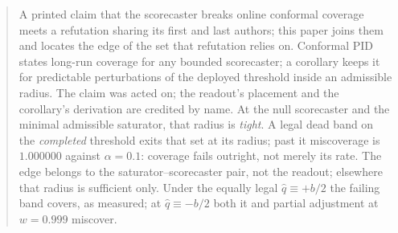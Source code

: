 \documentclass{article}
\begin{document}
\begin{abstract}
A printed claim that the scorecaster breaks online conformal coverage meets a
refutation sharing its first and last authors; this paper joins them and locates the edge of the set that
refutation relies on. Conformal PID states long-run coverage for any
bounded scorecaster; a corollary keeps it for predictable perturbations of the deployed
threshold inside an admissible radius. The claim was acted on;
the readout's
placement and the corollary's derivation are credited by name.
At the null scorecaster and the minimal admissible saturator, that radius is \emph{tight}. A legal dead band on
the \emph{completed} threshold exits that set at its radius; past it miscoverage is $1.000000$ against
$\alpha = 0.1$: coverage fails outright, not merely its rate. The edge belongs to the
saturator--scorecaster pair, not the readout; elsewhere that radius is sufficient
only. Under the equally legal $\hat{q} \equiv +b/2$ the failing band covers, as measured; at
$\hat{q} \equiv -b/2$ both it and partial adjustment at $w = 0.999$ miscover.
\end{abstract}
\end{document}
